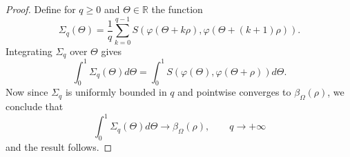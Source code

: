 \documentclass[10pt,a4paper]{amsart}
\def\R{\mathbb{R}}
\begin{document}
\begin{proof}
    Define for $q\geq 0$ and $\Theta\in\R$ the function
    \[
    \Sigma_q(\Theta) = \frac{1}{q}\sum_{k=0}^{q-1}S(\varphi(\Theta+k\rho),\varphi(\Theta+(k+1)\rho)).
    \]
    Integrating $\Sigma_q$ over $\Theta$ gives
    \[
    \int_0^1 \Sigma_q(\Theta) d\Theta = \int_0^1 S(\varphi(\Theta),\varphi(\Theta+\rho))d\Theta.
    \]
    Now since $\Sigma_q$ is uniformly bounded in $q$ and pointwise converges to $\beta_{\Omega}(\rho)$, we conclude that
    \[
    \int_0^1 \Sigma_q(\Theta) d\Theta\longrightarrow\beta_{\Omega}(\rho),\qquad q\longrightarrow+\infty
    \]
    and the result follows.
\end{proof}
\end{document}
